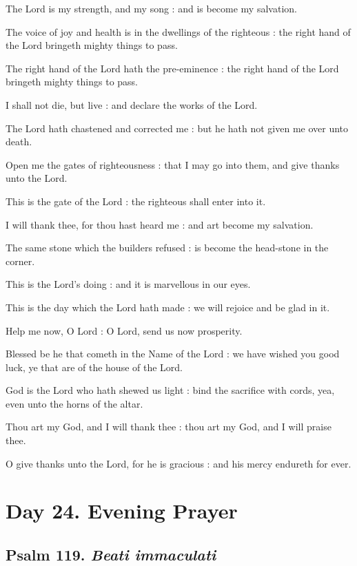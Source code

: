 The Lord is my strength, and my song : and is become my salvation.\par
{}The voice of joy and health is in the dwellings of the righteous : the right hand of the Lord bringeth mighty things to pass.\par
{}The right hand of the Lord hath the pre-eminence : the right hand of the Lord bringeth mighty things to pass.\par
{}I shall not die, but live : and declare the works of the Lord.\par
{}The Lord hath chastened and corrected me : but he hath not given me over unto death.\par
{}Open me the gates of righteousness : that I may go into them, and give thanks unto the Lord.\par
{}This is the gate of the Lord : the righteous shall enter into it.\par
{}I will thank thee, for thou hast heard me : and art become my salvation.\par
{}The same stone which the builders refused : is become the head-stone in the corner.\par
{}This is the Lord's doing : and it is marvellous in our eyes.\par
{}This is the day which the Lord hath made : we will rejoice and be glad in it.\par
{}Help me now, O Lord : O Lord, send us now prosperity.\par
{}Blessed be he that cometh in the Name of the Lord : we have wished you good luck, ye that are of the house of the Lord.\par
{}God is the Lord who hath shewed us light : bind the sacrifice with cords, yea, even unto the horns of the altar.\par
{}Thou art my God, and I will thank thee : thou art my God, and I will praise thee.\par
{}O give thanks unto the Lord, for he is gracious : and his mercy endureth for ever.\par

\section*{Day 24. Evening Prayer}

\subsection{Psalm 119. \textit{Beati immaculati}}

